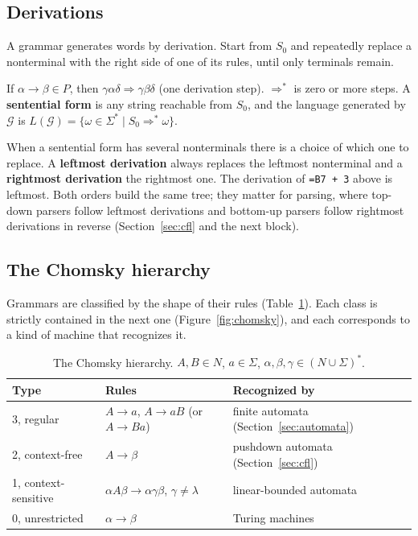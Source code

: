 \subsection{Derivations}

A grammar generates words by derivation. Start from $S_0$ and repeatedly
replace a nonterminal with the right side of one of its rules, until only
terminals remain.

\begin{definition}
If $\alpha \to \beta \in P$, then $\gamma \alpha \delta \Rightarrow \gamma \beta
\delta$ (one derivation step). $\Rightarrow^*$ is zero or more steps. A
\textbf{sentential form} is any string reachable from $S_0$, and the language
generated by $\mathcal{G}$ is
$L(\mathcal{G}) = \{ \omega \in \Sigma^* \mid S_0 \Rightarrow^* \omega \}$.
\end{definition}

When a sentential form has several nonterminals there is a choice of which one
to replace. A \textbf{leftmost derivation} always replaces the leftmost
nonterminal and a \textbf{rightmost derivation} the rightmost one. The
derivation of \texttt{=B7 + 3} above is leftmost. Both orders build the same
tree; they matter for parsing, where top-down parsers follow leftmost
derivations and bottom-up parsers follow rightmost derivations in reverse
(Section~\ref{sec:cfl} and the next block).

\subsection{The Chomsky hierarchy}

Grammars are classified by the shape of their rules
(Table~\ref{tab:chomsky}). Each class is strictly contained in the next one
(Figure~\ref{fig:chomsky}), and each corresponds to a kind of machine that
recognizes it.

\begin{table}[h]
\centering
\small
\begin{tabular}{l l l}
  \toprule
  Type & Rules & Recognized by \\
  \midrule
  3, regular            & $A \to a$, $A \to aB$ (or $A \to Ba$)                     & finite automata (Section~\ref{sec:automata}) \\
  2, context-free       & $A \to \beta$                                               & pushdown automata (Section~\ref{sec:cfl}) \\
  1, context-sensitive  & $\alpha A \beta \to \alpha \gamma \beta$, $\gamma \ne \lambda$ & linear-bounded automata \\
  0, unrestricted       & $\alpha \to \beta$                                          & Turing machines \\
  \bottomrule
\end{tabular}
\caption{The Chomsky hierarchy. $A, B \in N$, $a \in \Sigma$, $\alpha, \beta, \gamma \in (N \cup \Sigma)^*$.}
\label{tab:chomsky}
\end{table}

